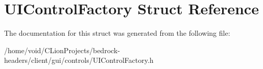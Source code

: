 \hypertarget{struct_u_i_control_factory}{}\section{U\+I\+Control\+Factory Struct Reference}
\label{struct_u_i_control_factory}


The documentation for this struct was generated from the following file\+:\begin{DoxyCompactItemize}
\item 
/home/void/\+C\+Lion\+Projects/bedrock-\/headers/client/gui/controls/U\+I\+Control\+Factory.\+h\end{DoxyCompactItemize}
